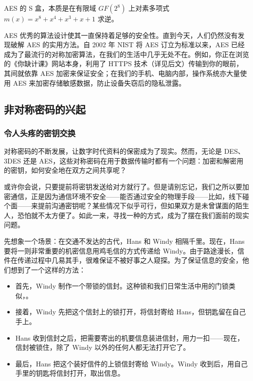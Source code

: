 \begin{note}
  AES 的 S 盒，本质是在有限域 $GF(2^8)$ 上对素多项式 $m(x) = x^8 + x^4 + x^3 + x + 1$ 求逆。
\end{note}

AES 优秀的算法设计使其一直保持着足够的安全性。直到今天，人们仍然没有发现破解 AES 的实用方法。自 2002 年 NIST 将 AES 订立为标准以来，AES 已经成为了最流行的对称加密算法，在我们的生活中几乎无处不在。例如，你正在浏览的《你缺计课》网站本身，利用了 HTTPS 技术（详见后文）传输到你的眼前，其间就依靠 AES 加密来保证安全；在我们的手机、电脑内部，操作系统亦大量使用 AES 来加密存储敏感数据，防止设备失窃后的隐私泄露。

\subsection{非对称密码的兴起}

\subsubsection{令人头疼的密钥交换}

对称密码的不断发展，让数字时代资料的保密成为了现实。然而，无论是 DES、3DES 还是 AES，这些对称密码在用于数据传输时都有一个问题：加密和解密用的密钥，如何安全地在双方之间共享呢？

或许你会说，只要提前将密钥发送给对方就行了。但是请别忘记，我们之所以要加密通信，正是因为通信环境不安全——能否通过安全的物理手段——比如，线下碰个面——来提前沟通密钥呢？某些情况下似乎可行，但如果双方是未曾谋面的陌生人，恐怕就不太方便了。如此一来，寻找一种的方式，成为了摆在我们面前的现实问题。

先想象一个场景：在交通不发达的古代，Hans 和 Windy 相隔千里。现在，Hans 要将一则非常重要的机密信息用鸡毛信的方式传递给 Windy。由于路途漫长，信件在传递过程中几易其手，很难保证不被好事之人窥探。为了保证信息的安全，他们想到了一个这样的方法：

\begin{itemize}
  \item 首先，Windy 制作一个带锁的信封。这种锁和我们日常生活中用的门锁类似，。
  \item 接着，Windy 先把这个信封上的锁打开，将信封寄给 Hans，但钥匙留在自己手上。
  \item Hans 收到信封之后，把需要寄出的机要信息装进信封，用力一扣——现在，信封被锁住，除了 Windy 以外的任何人都无法打开它了。
  \item 最后，Hans 把这个装好信件的上锁信封寄给 Windy。Windy 收到后，用自己手里的钥匙将信封打开，取出信息。
\end{itemize}

